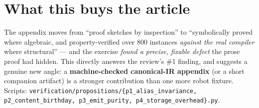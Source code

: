 \documentclass[11pt]{article}
\begin{document}
\section{What this buys the article}
The appendix moves from ``proof sketches by inspection'' to ``symbolically proved where algebraic, and
property-verified over 800 instances \emph{against the real compiler} where structural'' --- and the exercise
\emph{found a precise, fixable defect} the prose proof had hidden. This directly answers the review's \#1 finding,
and suggests a genuine new angle: a \textbf{machine-checked canonical-IR appendix} (or a short companion artifact)
is a stronger contribution than one more robot fixture. Scripts:
\texttt{verification/propositions/\{p1\_alias\_invariance, p2\_content\_birthday, p3\_emit\_purity,
p4\_storage\_overhead\}.py}.
\end{document}
